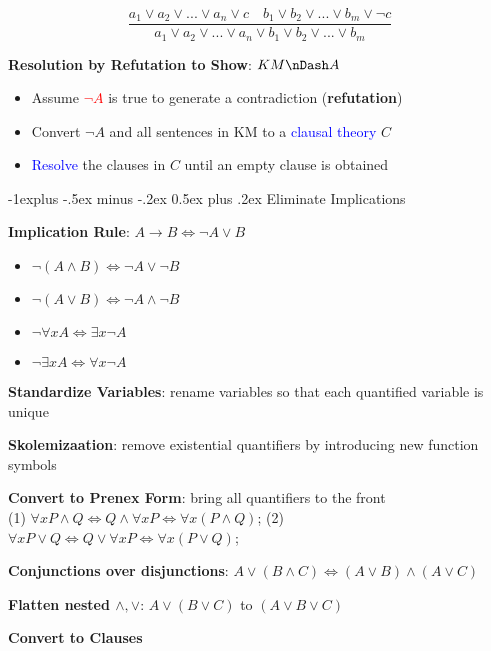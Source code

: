 \documentclass[7pt,landscape]{article}
\makeatletter
\renewcommand{\subsection}{\@startsection{subsection}{2}{0mm}%
                                {-1explus -.5ex minus -.2ex}%
                                {0.5ex plus .2ex}%
                                {\normalfont\normalsize\bfseries}}
\makeatother
\begin{document}
\begin{multicols}{2}
$$ \frac{a_1 \lor a_2 \lor ... \lor a_n \lor c \quad b_1 \lor b_2 \lor ... \lor b_m \lor \neg c}{a_1 \lor a_2 \lor ... \lor a_n \lor b_1 \lor b_2 \lor ... \lor b_m} $$

\textbf{Resolution by Refutation to Show}: \textcolor{purple}{$KM \nDash A$}

\begin{itemize}
    \item Assume \textcolor{red}{$\neg A$} is true to generate a contradiction (\textbf{refutation})
    \item Convert $\neg A$ and all sentences in KM to a \textcolor{blue}{clausal theory} $C$
    \item \textcolor{blue}{Resolve} the clauses in $C$ until an empty clause is obtained
\end{itemize}

\subsection{Eliminate Implications}

\textbf{Implication Rule}: $A \rightarrow B \iff \neg A \lor B$

\begin{itemize}
    \item $\neg (A \land B) \iff \neg A \lor \neg B$
    \item $\neg (A \lor B) \iff \neg A \land \neg B$
    \item $\neg \forall x A \iff \exists x \neg A$
    \item $\neg \exists x A \iff \forall x \neg A$
\end{itemize}

\textbf{Standardize Variables}: rename variables so that each quantified variable is unique

\textbf{Skolemizaation}: remove existential quantifiers by introducing new function symbols

\textbf{Convert to Prenex Form}: bring all quantifiers to the front \\
(1) $\forall x P \land Q \iff Q \land \forall x P \iff \forall x (P \land Q)$; 
(2) $\forall x P \lor Q \iff Q \lor \forall x P \iff \forall x (P \lor Q)$; 

\textbf{Conjunctions over disjunctions}: $A \lor (B \land C) \iff (A \lor B) \land (A \lor C)$

\textbf{Flatten nested $\land, \lor$}: $A \lor (B \lor C)$ to $(A \lor B \lor C)$

\textbf{Convert to Clauses}


\end{multicols}
\end{document}
